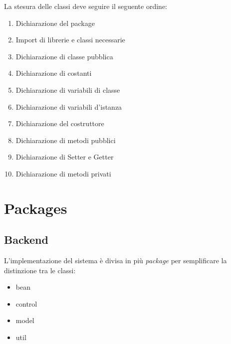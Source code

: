\documentclass[12pt,a4paper]{article}
\begin{document}
La stesura delle classi deve seguire il seguente ordine:
\begin{enumerate}
\item Dichiarazione del package
\item Import di librerie e classi necessarie
\item Dichiarazione di classe pubblica
\item Dichiarazione di costanti
\item Dichiarazione di variabili di classe
\item Dichiarazione di variabili d'istanza
\item Dichiarazione del costruttore
\item Dichiarazione di metodi pubblici
\item Dichiarazione di Setter e Getter
\item Dichiarazione di metodi privati
\end{enumerate}

\newpage

\section{Packages}
\subsection{Backend}
L'implementazione del sistema è divisa in più \emph{package} per semplificare la distinzione tra le classi:
\begin{itemize}
\item bean
\item control
\item model
\item util
\end{itemize}
\end{document}
